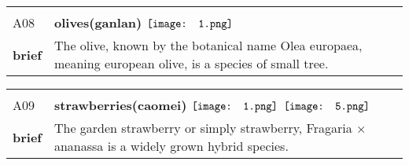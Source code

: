 \documentclass[UTF8]{article}
\begin{document}
            \begin{tabularx}{\textwidth}{p{1.5cm}X}
            \arrayrulecolor{myBlue}
        	\hline\\
            \small{A08}&
            \large{\bfseries{olives(ganlan)}}\hfill
                                                $\vcenter{\hbox{\texttt{[image: 1.png]}}}$
                                                                \phantom{$\vcenter{\hbox{\texttt{[image: 2.png]}}}$}
                                                                \phantom{$\vcenter{\hbox{\texttt{[image: 3.png]}}}$}
                                                                \phantom{$\vcenter{\hbox{\texttt{[image: 4.png]}}}$}
                                                                \phantom{$\vcenter{\hbox{\texttt{[image: 5.png]}}}$}
                                                                \phantom{$\vcenter{\hbox{\texttt{[image: 6.png]}}}$}
                                                                \phantom{$\vcenter{\hbox{\texttt{[image: 7.png]}}}$}
                                        \\[10pt]
            \large{\bfseries{brief}}&\noindent\parbox[c]{\hsize}{The olive, known by the botanical name Olea europaea, meaning european olive, is a species of small tree.} \\[5pt]
            \hline\\[-10pt]
        \end{tabularx}
            \begin{tabularx}{\textwidth}{p{1.5cm}X}
            \arrayrulecolor{myBlue}
        	\hline\\
            \small{A09}&
            \large{\bfseries{strawberries(caomei)}}\hfill
                                                $\vcenter{\hbox{\texttt{[image: 1.png]}}}$
                                                                \phantom{$\vcenter{\hbox{\texttt{[image: 2.png]}}}$}
                                                                \phantom{$\vcenter{\hbox{\texttt{[image: 3.png]}}}$}
                                                                \phantom{$\vcenter{\hbox{\texttt{[image: 4.png]}}}$}
                                                                $\vcenter{\hbox{\texttt{[image: 5.png]}}}$
                                                                \phantom{$\vcenter{\hbox{\texttt{[image: 6.png]}}}$}
                                                                \phantom{$\vcenter{\hbox{\texttt{[image: 7.png]}}}$}
                                        \\[10pt]
            \large{\bfseries{brief}}&\noindent\parbox[c]{\hsize}{The garden strawberry or simply strawberry, Fragaria × ananassa is a widely grown hybrid species.} \\[5pt]
            \hline\\[-10pt]
        \end{tabularx}
\end{document}
